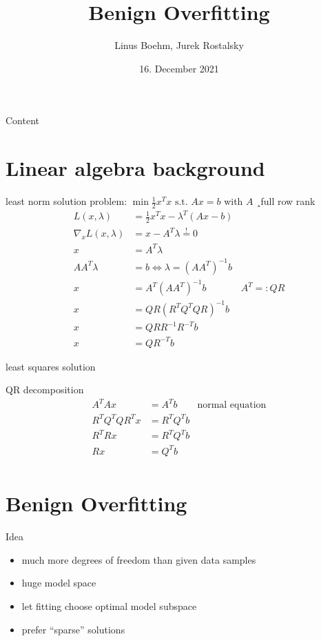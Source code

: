 \documentclass{beamer}
\title{Benign Overfitting}
\date{16. December 2021}
\author{Linus Boehm, Jurek Rostalsky}
\begin{document}
\maketitle

\begin{frame}{Content}
\tableofcontents
\end{frame}

\section{Linear algebra background}

\begin{frame} {least norm solution}
problem: \(\min \frac{1}{2} x^Tx \text{ s.t. } Ax = b\) with \(A\) ¸full row rank
\pause
\begin{align*}
	L(x,\lambda) &= \frac{1}{2} x^Tx - \lambda^T (Ax -b)\\
	\nabla_x L(x,\lambda) &= x - A^T \lambda \stackrel{!}{=} 0\\
	x & = A^T \lambda\\
	AA^T \lambda &= b \Leftrightarrow \lambda = (AA^T)^{-1} b\\
	x &= A^T(AA^T)^{-1} b & A^T =: QR\\
	x &= QR(R^TQ^TQR)^{-1}b\\
	x &= QRR^{-1} R^{-T}b\\
	x &= QR^{-T}b
\end{align*}
\end{frame}

\begin{frame}{least squares solution}
\begin{block}{QR decomposition}
\begin{align*}
	A^TAx &= A^T b & \text{normal equation}\\
	R^TQ^TQR^Tx &= R^TQ^Tb\\
	R^TRx & = R^TQ^Tb\\
	Rx &= Q^T b\\
\end{align*}
\end{block}
\end{frame}

\section{Benign Overfitting}

\begin{frame}{Idea}
\begin{itemize}
	\item much more degrees of freedom than given data samples
	\item huge model space
	\item let fitting choose optimal model subspace
	\item prefer \enquote{sparse} solutions
\end{itemize}

\end{frame}
\end{document}

